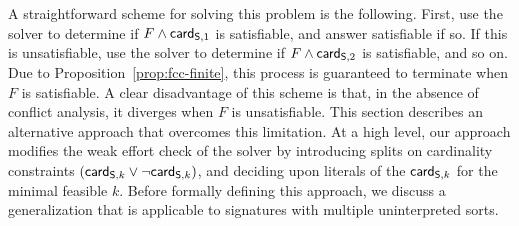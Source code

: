 \documentclass{svjour3}                     %
\begin{document}
A straightforward scheme for solving this problem is the following.
First, use the solver to determine if $F \wedge \card[\So,1]$ is satisfiable, and answer satisfiable if so.
If this is unsatisfiable, use the solver to determine if $F \wedge \card[\So,2]$ is satisfiable, and so on.
Due to Proposition~\ref{prop:fcc-finite}, this process is guaranteed to terminate when $F$ is satisfiable.
A clear disadvantage of this scheme is that, 
in the absence of conflict analysis, 
it diverges when $F$ is unsatisfiable.
This section describes an alternative approach 
that overcomes this limitation.
At a high level, our approach modifies the weak effort check 
of the \fcc solver by introducing splits on cardinality constraints
$(\card[\So,k] \vee \neg \card[\So,k])$,
and deciding upon literals of the $\card[\So,k]$ for the minimal feasible $k$.
Before formally defining this approach,
we discuss a generalization that is applicable to signatures with multiple uninterpreted sorts.
\end{document}
